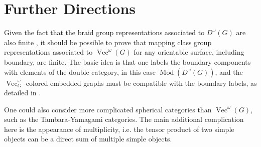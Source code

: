 \documentclass{amsart}
\DeclareMathOperator{\Mod}{Mod}
\DeclareMathOperator{\Vect}{Vec}
\begin{document}
\section{Further Directions}
Given the fact that the braid group representations associated to $D^\omega(G)$ are also finite \cite{erw}, it should  be possible
 to prove that mapping class group representations associated to $\Vect^\omega(G)$ for any orientable surface, including boundary, are finite.  
The basic idea is that one labels the boundary components with elements of the double category, in this case $\Mod(D^\omega(G))$, and the
$\Vect_G^\omega$-colored embedded graphs must be compatible with the boundary labels, as detailed in \cite{kirillovStringNets}.  

One could also consider more complicated spherical categories than $\Vect^\omega(G)$, such as the 
Tambara-Yamagami categories.  The main additional complication here is the appearance of multiplicity, i.e. the tensor product of 
two simple objects can be a direct sum of multiple simple objects.  
\medskip


 


\end{document}

